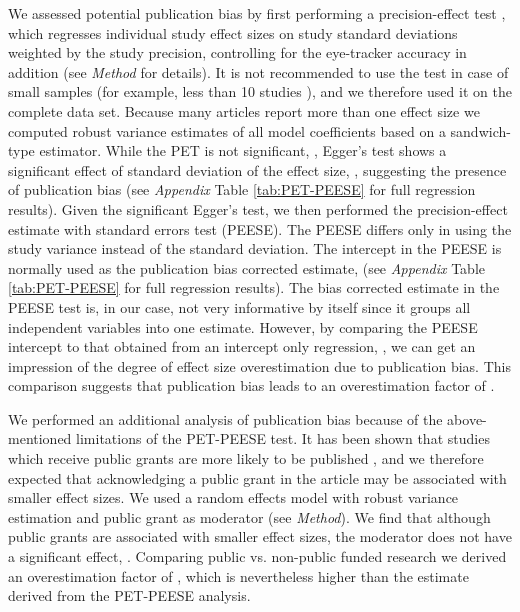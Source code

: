 We assessed potential publication bias by first performing a precision-effect test \citep[PET][]{stanley2014}, which regresses individual study effect sizes on study standard deviations weighted by the study precision, controlling for the eye-tracker accuracy in addition (see \textit{Method} for details). It is not recommended to use the test in case of small samples (for example, less than 10 studies \citep{vanaert2019}), and we therefore used it on the complete data set. Because many articles report more than one effect size we computed robust variance estimates of all model coefficients based on a sandwich-type estimator. While the PET is not significant, \unskip, Egger's test shows a significant effect of standard deviation of the effect size, \unskip, suggesting the presence of publication bias (see \textit{Appendix} Table \ref{tab:PET-PEESE} for full regression results). Given the significant Egger's test, we then performed the precision-effect estimate with standard errors test (PEESE). The PEESE differs only in using the study variance instead of the standard deviation. The intercept in the PEESE is normally used as the publication bias corrected estimate,  (see \textit{Appendix} Table \ref{tab:PET-PEESE} for full regression results). The bias corrected estimate in the PEESE test is, in our case, not very informative by itself since it groups all independent variables into one estimate. However, by comparing the PEESE intercept to that obtained from an intercept only regression, \unskip, we can get an impression of the degree of effect size overestimation due to publication bias. This comparison suggests that publication bias leads to an overestimation factor of \unskip.

We performed an additional analysis of publication bias because of the above-mentioned limitations of the PET-PEESE test. It has been shown that studies which receive public grants are more likely to be published \citep{canestaro2017}, and we therefore expected that acknowledging a public grant in the article may be associated with smaller effect sizes. We used a random effects model with robust variance estimation and public grant as moderator (see \textit{Method}). We find that although public grants are associated with smaller effect sizes, the moderator does not have a significant effect, \unskip. Comparing public vs. non-public funded research we derived an overestimation factor of \unskip, which is nevertheless higher than the estimate derived from the PET-PEESE analysis.

